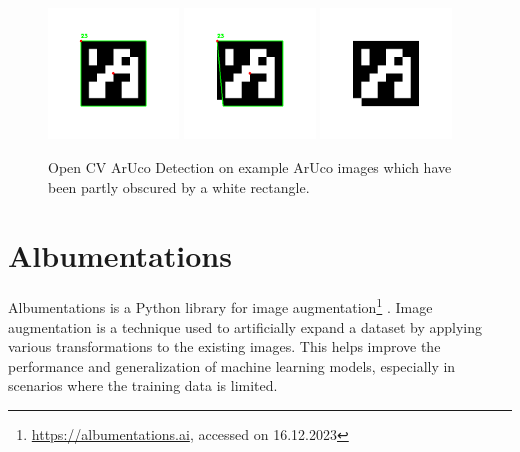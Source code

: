\documentclass[10pt]{book}
\begin{document}
\begin{figure}
  \centering
     {\includegraphics[width=0.31\textwidth]{image/rec}}
     {\includegraphics[width=0.31\textwidth]{image/skewed-rec}}
     {\includegraphics[width=0.31\textwidth]{image/no-rec}}
  \caption{Open CV ArUco Detection on example \ac{ArUco} images which have been partly obscured by a white rectangle.}
  \label{fig:aruco-det}
\end{figure}

\section{Albumentations}

Albumentations is a Python library for image augmentation\footnote{\url{https://albumentations.ai}, accessed on 16.12.2023} \cite{info11020125}. Image augmentation is a technique used to artificially expand a dataset by applying various transformations to the existing images. This helps improve the performance and generalization of machine learning models, especially in scenarios where the training data is limited. 
\end{document}
